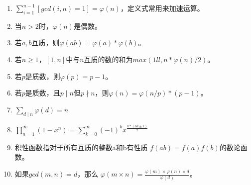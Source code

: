 \documentclass[E:/GsjzTle/main/main.tex]{subfiles}
\begin{document}
\begin{enumerate}
\def\labelenumi{\arabic{enumi}.}
\item
  \(\sum_{i=1}^{n-1}[gcd(i,n)=1] = \varphi(n)\)，定义式常用来加速运算。
\item
  当\(n > 2\)时，\(\varphi(n)\)是偶数。
\item
  若\(a,b\)互质，则\(\varphi(ab) = \varphi(a) * \varphi(b)\)。
\item

  若\(n \geqslant 1\)，\([1,n]\)中与\(n\)互质的数的和为\(max(1ll , n * \varphi(n) / 2)\)。
\item
  若\(p\)是质数，则\(\varphi(p)=p-1\)。
\item

  若\(p\)是质数，且\(p \mid n\)但\(p \nmid n\)，则\(\varphi(n) = \varphi(n/p) * (p-1)\)。
\item
  \(\sum_{d \mid n} \varphi(d) = n\)
\item

  \(\prod_{n=1}^{\infty}(1 - x^n) = \sum_{k=0}^{\infty}(-1)^{k}x^{\frac{k*(3k\pm 1)}{2}}\)
\item
  积性函数指对于所有互质的整数a和b有性质 \(f(ab)=f(a)f(b)\)的数论函数。
\item
  如果\(gcd(m,n)=d\)，那么
  \(\varphi(m\times n) = \frac{\varphi(m) \times \varphi(n) \times d}{\varphi(d)}\)。
\end{enumerate}
\end{document}

